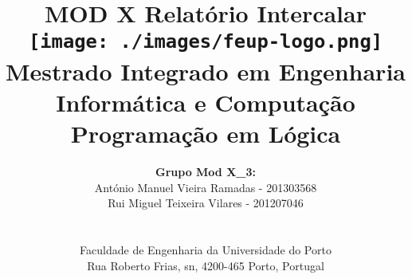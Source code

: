 \documentclass[a4paper]{article}
\begin{document}
\setlength{\textwidth}{16cm}
\setlength{\textheight}{22cm}

\title{\Huge\textbf{MOD X}\linebreak\linebreak\linebreak
\Large\textbf{Relatório Intercalar}\linebreak\linebreak
\linebreak\linebreak
\texttt{[image: ./images/feup-logo.png]}\linebreak\linebreak
\linebreak\linebreak
\Large{Mestrado Integrado em Engenharia Informática e Computação} \linebreak\linebreak
\Large{Programação em Lógica}\linebreak
}

\author{\textbf{Grupo Mod X\_3:}\\
António Manuel Vieira Ramadas - 201303568 \\
Rui Miguel Teixeira Vilares - 201207046 \\
\linebreak\linebreak \\
 \\ Faculdade de Engenharia da Universidade do Porto \\ Rua Roberto Frias, s\/n, 4200-465 Porto, Portugal \linebreak\linebreak\linebreak
\linebreak\linebreak\vspace{1cm}}

\maketitle
\thispagestyle{empty}


\newpage
\end{document}
